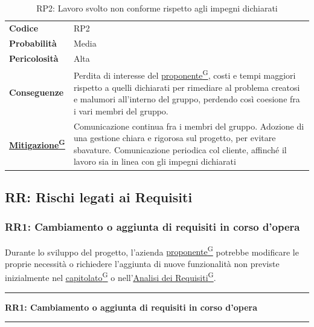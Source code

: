 \documentclass[a4paper,12pt]{article}
\providecommand{\glslink}[2]{\href{https://alittlebyte-19.github.io/Documentazione/glossario.html\#gls-#1}{\underline{#2}\textsuperscript{\scriptsize G}}}
\begin{document}
\begin{table}[h]

\begin{tabular}{>{\bfseries}p{3cm} | p{12.2cm}}
Codice & RP2 \\

Probabilità & Media\\

Pericolosità & Alta\\

Conseguenze & Perdita di interesse del \glslink{committente-proponente}{proponente}, costi e tempi maggiori rispetto a quelli dichiarati per rimediare al problema creatosi e malumori
all'interno del gruppo, perdendo così coesione fra i vari membri del gruppo.\\

\glslink{mitigazione-dei-rischi}{Mitigazione} & Comunicazione continua fra i membri del gruppo. Adozione di una gestione chiara e rigorosa sul progetto, per evitare sbavature. Comunicazione periodica col cliente, affinché il lavoro
sia in linea con gli impegni dichiarati\\
\end{tabular}
\caption{RP2: Lavoro svolto non conforme rispetto agli impegni dichiarati}
\end{table}

\newpage
\subsection{RR: Rischi legati ai Requisiti}
\subsubsection{RR1: Cambiamento o aggiunta di requisiti in corso d'opera}
Durante lo sviluppo del progetto, l'azienda \glslink{committente-proponente}{proponente} potrebbe modificare le proprie necessità o richiedere l'aggiunta di nuove funzionalità non previste inizialmente nel \glslink{capitolato}{capitolato} o nell'\glslink{analisi-dei-requisiti-adr}{Analisi dei Requisiti}.

\vspace{0.5cm}
\hrule
\vspace{0.5em}
\textbf{RR1: Cambiamento o aggiunta di requisiti in corso d'opera}
\vspace{0.5em}
\hrule
\vspace{1cm}
\end{document}

